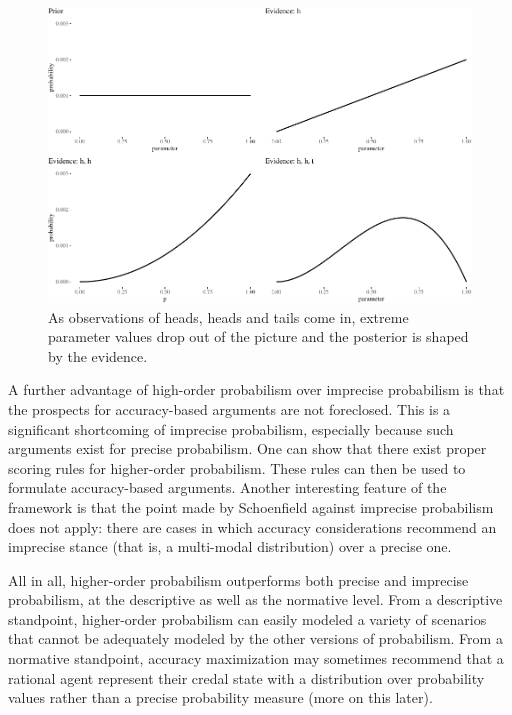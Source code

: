 \documentclass[
  10pt,
  dvipsnames,enabledeprecatedfontcommands]{scrartcl}
\begin{document}
\begin{figure}[t]

\begin{center}\includegraphics[width=1\linewidth]{chapter-outline_files/figure-latex/fig:inertia3-1} \end{center}
\caption{As observations of heads, heads and tails come in, extreme parameter values drop out of the picture and the posterior is shaped by the evidence.}
\label{fig:intertia2}
\end{figure}

A further advantage of high-order probabilism over imprecise probabilism
is that the prospects for accuracy-based arguments are not foreclosed.
This is a significant shortcoming of imprecise probabilism, especially
because such arguments exist for precise probabilism. One can show that
there exist proper scoring rules for higher-order probabilism. These
rules can then be used to formulate accuracy-based arguments. Another
interesting feature of the framework is that the point made by
Schoenfield against imprecise probabilism does not apply: there are
cases in which accuracy considerations recommend an imprecise stance
(that is, a multi-modal distribution) over a precise
one.

All in all, higher-order probabilism outperforms both precise and
imprecise probabilism, at the descriptive as well as the normative
level. From a descriptive standpoint, higher-order probabilism can
easily modeled a variety of scenarios that cannot be adequately modeled
by the other versions of probabilism. From a normative standpoint,
accuracy maximization may sometimes recommend that a rational agent
represent their credal state with a distribution over probability values
rather than a precise probability measure (more on this later).
\end{document}
